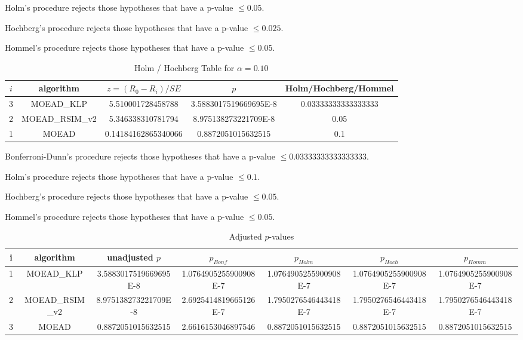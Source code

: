 \documentclass[a4paper,10pt]{article}
\begin{document}
\begin{landscape}
Holm's procedure rejects those hypotheses that have a p-value $\le0.05$.


Hochberg's procedure rejects those hypotheses that have a p-value $\le0.025$.


Hommel's procedure rejects those hypotheses that have a p-value $\le0.05$.


\begin{table}[!htp]
\centering\tiny
\caption{Holm / Hochberg Table for $\alpha=0.10$}
\begin{tabular}{ccccc}
$i$&algorithm&$z=(R_0 - R_i)/SE$&$p$&Holm/Hochberg/Hommel\\
\hline
3&MOEAD_KLP&5.510001728458788&3.5883017519669695E-8&0.03333333333333333\\
2&MOEAD_RSIM_v2&5.346338310781794&8.975138273221709E-8&0.05\\
1&MOEAD&0.14184162865340066&0.8872051015632515&0.1\\
\hline
\end{tabular}
\end{table}
Bonferroni-Dunn's procedure rejects those hypotheses that have a p-value $\le0.03333333333333333$.


Holm's procedure rejects those hypotheses that have a p-value $\le0.1$.


Hochberg's procedure rejects those hypotheses that have a p-value $\le0.05$.


Hommel's procedure rejects those hypotheses that have a p-value $\le0.05$.


\begin{table}[!htp]
\centering\tiny
\caption{Adjusted $p$-values}
\begin{tabular}{ccccccc}
i&algorithm&unadjusted $p$&$p_{Bonf}$&$p_{Holm}$&$p_{Hoch}$&$p_{Homm}$\\
\hline
1&MOEAD_KLP&3.5883017519669695E-8&1.0764905255900908E-7&1.0764905255900908E-7&1.0764905255900908E-7&1.0764905255900908E-7\\
2&MOEAD_RSIM_v2&8.975138273221709E-8&2.6925414819665126E-7&1.7950276546443418E-7&1.7950276546443418E-7&1.7950276546443418E-7\\
3&MOEAD&0.8872051015632515&2.6616153046897546&0.8872051015632515&0.8872051015632515&0.8872051015632515\\
\hline
\end{tabular}
\end{table}


\end{landscape}
\end{document}
